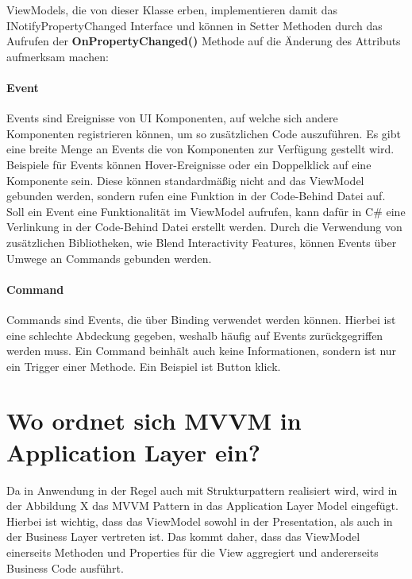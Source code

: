 \documentclass[titlepage=false,12pt]{scrreprt}
\begin{document}


\noindent
ViewModels, die von dieser Klasse erben, implementieren damit das INotifyPropertyChanged Interface und können in Setter Methoden durch das Aufrufen
der \textbf{OnPropertyChanged()} Methode auf die Änderung des Attributs aufmerksam machen:



\paragraph{Event}

Events sind Ereignisse von UI Komponenten, auf welche sich andere Komponenten registrieren 
können, um so zusätzlichen Code auszuführen. Es gibt eine breite Menge an Events die
von Komponenten zur Verfügung gestellt wird. Beispiele für Events können Hover-Ereignisse
oder ein Doppelklick auf eine Komponente sein.
Diese können standardmäßig nicht and das ViewModel
gebunden werden, sondern rufen eine Funktion in der Code-Behind Datei auf.
Soll ein Event eine Funktionalität im ViewModel aufrufen, kann dafür in C\# eine Verlinkung in der
Code-Behind Datei erstellt werden. Durch die Verwendung von zusätzlichen Bibliotheken, wie
Blend Interactivity Features, können Events über Umwege an Commands gebunden werden.

\paragraph{Command}

Commands sind Events, die über Binding verwendet werden können. Hierbei ist eine schlechte
Abdeckung gegeben, weshalb häufig auf Events zurückgegriffen werden muss. Ein Command
beinhält auch keine Informationen, sondern ist nur ein Trigger einer Methode. Ein Beispiel
ist Button klick.

\section{Wo ordnet sich MVVM in Application Layer ein?}

Da in Anwendung in der Regel auch mit Strukturpattern realisiert wird, wird in der Abbildung X
das MVVM Pattern in das Application Layer Model eingefügt. Hierbei ist wichtig, dass das
ViewModel sowohl in der Presentation, als auch in der Business Layer vertreten ist. Das kommt
daher, dass das ViewModel einerseits Methoden und Properties für die View aggregiert und andererseits
Business Code ausführt.  
\end{document}
